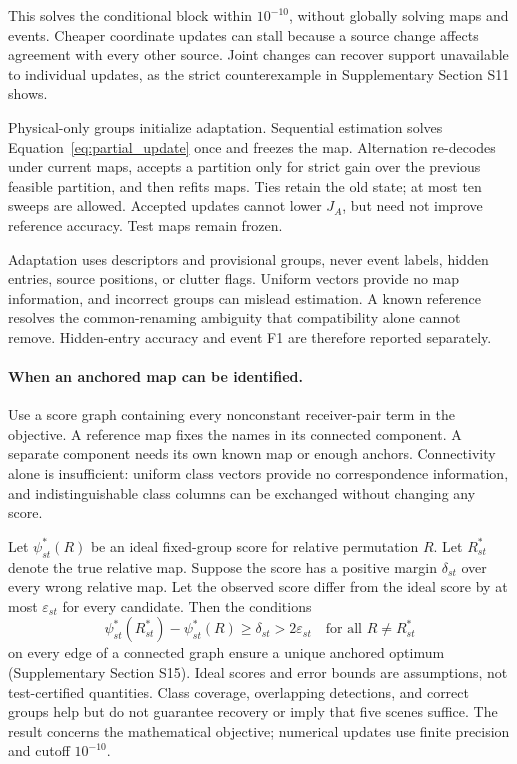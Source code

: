 This solves the conditional block within $10^{-10}$, without globally solving maps and events. Cheaper coordinate updates can stall because a source change affects agreement with every other source. Joint changes can recover support unavailable to individual updates, as the strict counterexample in Supplementary Section S11 shows.

Physical-only groups initialize adaptation. Sequential estimation solves Equation~\eqref{eq:partial_update} once and freezes the map. Alternation re-decodes under current maps, accepts a partition only for strict gain over the previous feasible partition, and then refits maps. Ties retain the old state; at most ten sweeps are allowed. Accepted updates cannot lower $J_A$, but need not improve reference accuracy. Test maps remain frozen.

Adaptation uses descriptors and provisional groups, never event labels, hidden entries, source positions, or clutter flags. Uniform vectors provide no map information, and incorrect groups can mislead estimation. A known reference resolves the common-renaming ambiguity that compatibility alone cannot remove. Hidden-entry accuracy and event F1 are therefore reported separately.

\paragraph{When an anchored map can be identified.}
Use a score graph containing every nonconstant receiver-pair term in the objective. A reference map fixes the names in its connected component. A separate component needs its own known map or enough anchors. Connectivity alone is insufficient: uniform class vectors provide no correspondence information, and indistinguishable class columns can be exchanged without changing any score.

Let $\psi^*_{st}(R)$ be an ideal fixed-group score for relative permutation $R$. Let $R^*_{st}$ denote the true relative map. Suppose the score has a positive margin $\delta_{st}$ over every wrong relative map. Let the observed score differ from the ideal score by at most $\varepsilon_{st}$ for every candidate. Then the conditions
\[
 \psi^*_{st}(R^*_{st})-\psi^*_{st}(R)\geq\delta_{st}>2\varepsilon_{st}
 \quad\text{for all }R\ne R^*_{st}
\]
on every edge of a connected graph ensure a unique anchored optimum (Supplementary Section S15). Ideal scores and error bounds are assumptions, not test-certified quantities. Class coverage, overlapping detections, and correct groups help but do not guarantee recovery or imply that five scenes suffice. The result concerns the mathematical objective; numerical updates use finite precision and cutoff $10^{-10}$.
